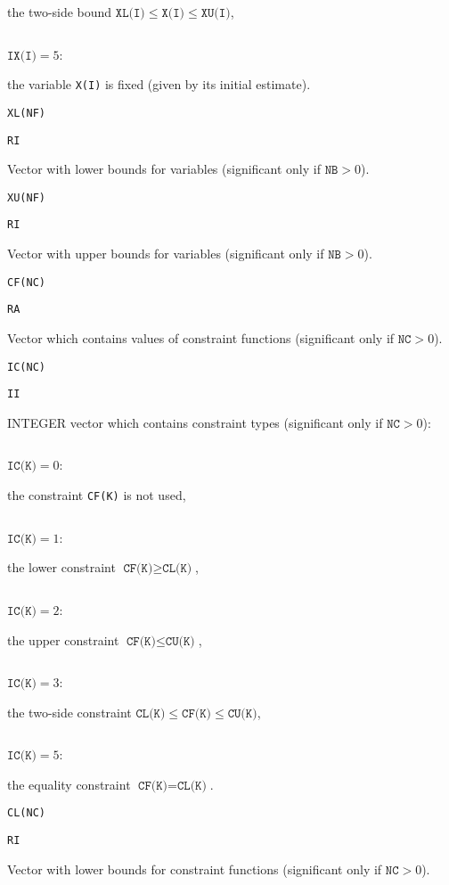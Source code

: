 \documentclass{article}
\begin{document}
{{  the two-side bound $\texttt{XL(I)}\le\texttt{X(I)}\le\texttt{XU(I)}$,}
  \par
\noindent\parbox{30mm}{$\;$}\parbox{20mm}{$\texttt{IX(I)}=5$:}\parbox[t]{71mm}{
  the variable \texttt{X(I)} is fixed (given by its initial estimate).}
  \par\vspace{2mm}
\noindent\parbox{20mm}{\texttt{XL(NF)}}\parbox{10mm}{\texttt{RI}}\parbox[t]{91mm}{
  Vector with lower bounds for variables
  (significant only if $\texttt{NB}>0$).}
  \par\vspace{2mm}
\noindent\parbox{20mm}{\texttt{XU(NF)}}\parbox{10mm}{\texttt{RI}}\parbox[t]{91mm}{
  Vector with upper bounds for variables
  (significant only if $\texttt{NB}>0$).}
  \par\vspace{2mm}
\noindent\parbox{20mm}{\texttt{CF(NC)}}\parbox{10mm}{\texttt{RA}}\parbox[t]{91mm}{
  Vector which contains values of constraint functions
  (significant only if $\texttt{NC}>0$).}
  \par\vspace{2mm}
\noindent\parbox{20mm}{\texttt{IC(NC)}}\parbox{10mm}{\texttt{II}}\parbox[t]{91mm}{
  INTEGER vector which contains constraint types (significant only if
  $\texttt{NC}>0$):}
  \par\vspace{1mm}
\noindent\parbox{30mm}{$\;$}\parbox{20mm}{$\texttt{IC(K)}=0$:}\parbox[t]{71mm}{
  the constraint \texttt{CF(K)} is not used,}
  \par
\noindent\parbox{30mm}{$\;$}\parbox{20mm}{$\texttt{IC(K)}=1$:}\parbox[t]{71mm}{
  the lower constraint $\texttt{CF(K)}\ge\texttt{CL(K)}$,}
  \par
\noindent\parbox{30mm}{$\;$}\parbox{20mm}{$\texttt{IC(K)}=2$:}\parbox[t]{71mm}{
  the upper constraint $\texttt{CF(K)}\le\texttt{CU(K)}$,}
  \par
\noindent\parbox{30mm}{$\;$}\parbox{20mm}{$\texttt{IC(K)}=3$:}\parbox[t]{71mm}{
  the two-side constraint $\texttt{CL(K)}\le\texttt{CF(K)}\le\texttt{CU(K)}$,}
  \par
\noindent\parbox{30mm}{$\;$}\parbox{20mm}{$\texttt{IC(K)}=5$:}\parbox[t]{71mm}{
  the equality constraint $\texttt{CF(K)}=\texttt{CL(K)}$.}
  \par\vspace{2mm}
\noindent\parbox{20mm}{\texttt{CL(NC)}}\parbox{10mm}{\texttt{RI}}\parbox[t]{91mm}{
  Vector with lower bounds for constraint functions
  (significant only if $\texttt{NC}>0$).}
}
\end{document}
